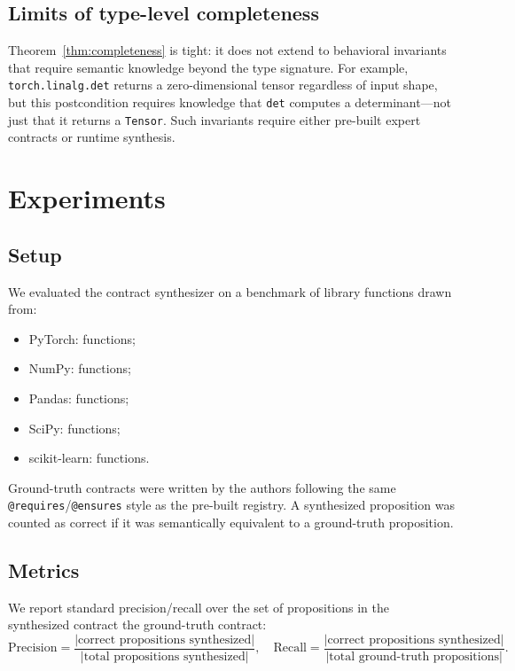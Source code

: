 \documentclass[11pt]{article}
\begin{document}
\subsection{Limits of type-level completeness}

Theorem~\ref{thm:completeness} is tight: it does not extend to
behavioral invariants that require semantic knowledge beyond the type
signature.  For example, \texttt{torch.linalg.det} returns a
zero-dimensional tensor regardless of input shape, but this
postcondition requires knowledge that \texttt{det} computes a
determinant---not just that it returns a \texttt{Tensor}.  Such
invariants require either pre-built expert contracts or runtime
synthesis.

\section{Experiments}\label{sec:experiments}

\subsection{Setup}

We evaluated the \JuGeo{} contract synthesizer on a benchmark of
\ppXXXIXTotalContracts{} library functions drawn from:
\begin{itemize}
  \item PyTorch: \ppXXXIXPytorchCount{} functions;
  \item NumPy: \ppXXXIXNumpyCount{} functions;
  \item Pandas: \ppXXXIXPandasCount{} functions;
  \item SciPy: \ppXXXIXScipyCount{} functions;
  \item scikit-learn: \ppXXXIXSklearnCount{} functions.
\end{itemize}

Ground-truth contracts were written by the authors following the same
\texttt{@requires}/\texttt{@ensures} style as the pre-built registry.
A synthesized proposition was counted as correct if it was
semantically equivalent to a ground-truth proposition.

\subsection{Metrics}

We report standard precision/recall over the set of propositions in
the synthesized contract \wrt the ground-truth contract:
\[
  \text{Precision} = \frac{|\text{correct propositions synthesized}|}
                          {|\text{total propositions synthesized}|},
  \quad
  \text{Recall} = \frac{|\text{correct propositions synthesized}|}
                       {|\text{total ground-truth propositions}|}.
\]
\end{document}
